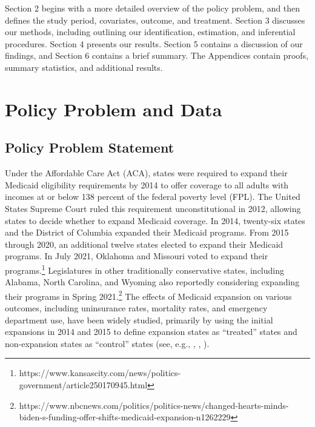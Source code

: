 \documentclass[aoas]{imsart}
\theoremstyle{plain}
\theoremstyle{remark}
\begin{document}
Section 2 begins with a more detailed overview of the policy problem, and then defines the study period, covariates, outcome, and treatment. Section 3 discusses our methods, including outlining our identification, estimation, and inferential procedures. Section 4 presents our results. Section 5 contains a discussion of our findings, and Section 6 contains a brief summary. The Appendices contain proofs, summary statistics, and additional results.

\section{Policy Problem and Data}

\subsection{Policy Problem Statement}

Under the Affordable Care Act (ACA), states were required to expand their Medicaid eligibility requirements by 2014 to offer coverage to all adults with incomes at or below 138 percent of the federal poverty level (FPL). The United States Supreme Court ruled this requirement unconstitutional in 2012, allowing states to decide whether to expand Medicaid coverage. In 2014, twenty-six states and the District of Columbia expanded their Medicaid programs. From 2015 through 2020, an additional twelve states elected to expand their Medicaid programs. In July 2021, Oklahoma and Missouri voted to expand their programs.\footnote{https://www.kansascity.com/news/politics-government/article250170945.html} Legislatures in other traditionally conservative states, including Alabama, North Carolina, and Wyoming also reportedly considering expanding their programs in Spring 2021.\footnote{https://www.nbcnews.com/politics/politics-news/changed-hearts-minds-biden-s-funding-offer-shifts-medicaid-expansion-n1262229} The effects of Medicaid expansion on various outcomes, including uninsurance rates, mortality rates, and emergency department use, have been widely studied, primarily by using the initial expansions in 2014 and 2015 to define expansion states as ``treated'' states and non-expansion states as ``control'' states (see, e.g., \cite{courtemanche2017early}, \cite{wherry2016early}, \cite{ladhania2021effect}).
\end{document}
